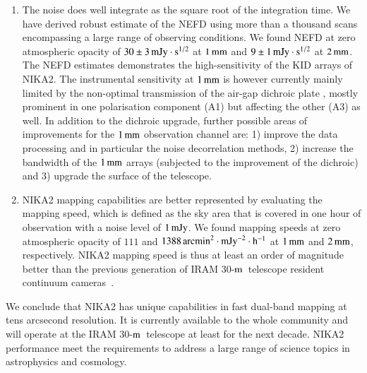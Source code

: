 \documentclass[traditionalabstract]{aa}
\newcommand{\trentemetre}{30-$\rm{m}$}
\newcommand{\lp}[1]{#1}
\begin{document}
\begin{enumerate}
{    uncertainties for the diffuse emission must further include the
    uncertainties on the reference beam efficiencies, as given in
    Table~\ref{tab:nika2summary}}. The absolute
  calibration uncertainties are of $5\%$ and the systematic
  calibration uncertainties evaluated at the IRAM
  \trentemetre\ reference Winter observing conditions are
  below $1\%$ in both channels.
   \vspace{1mm}
\item %
  The noise does well integrate as the square root of the integration time. We
  have derived robust estimate of the NEFD using more than a thousand scans
  encompassing a large range of observing conditions. We found NEFD at zero
  atmospheric opacity of $30 \pm 3\,\rm{mJy}\cdot s^{1/2}$ at $1\, \rm{mm}$ and
  $9 \pm 1\,\rm{mJy}\cdot s^{1/2}$ at $2\, \rm{mm}$.
  The NEFD estimates demonstrates the high-sensitivity of
  the KID arrays of NIKA2. 
  The instrumental sensitivity at $1\,\rm{mm}$
  is however currently mainly limited by the non-optimal transmission of
  the air-gap dichroic plate%
  , mostly prominent in one polarisation component
  (A1) but affecting the other (A3) as well.
  In addition to the dichroic upgrade, further possible areas of
  improvements for the $1\,\rm{mm}$ observation channel are: 1)
  improve the data processing and in particular the noise
  decorrelation methods, 2) increase the bandwidth of the $1\,\rm{mm}$
  arrays (subjected to the improvement of the dichroic) and 3)
  upgrade the surface of the telescope.
   \vspace{1mm}
\item  NIKA2 mapping capabilities are better represented by evaluating the
  mapping speed, which is defined as the sky area that is covered in one
  hour of observation with a noise level of $1\,\rm{mJy}$. We found
  mapping speeds at zero atmospheric opacity of $111$ and
  $1388\, \rm{arcmin}^2 \cdot \rm{mJy}^{-2} \cdot \rm{h}^{-1}$ at
  $1\, \rm{mm}$ and  $2\, \rm{mm}$, respectively. NIKA2 mapping speed is thus at
  least an order of magnitude better than the previous generation of IRAM
 \trentemetre\ telescope resident continuum cameras~\citep{Catalano2014, Staguhn2011_GISMO, Kreysa1999}.
  
\end{enumerate}


We conclude that NIKA2 has unique capabilities in fast dual-band
mapping at tens arcsecond resolution. {\lp It is currently available to the
whole community and will operate at the IRAM \trentemetre\ telescope
at least for the next decade.}
NIKA2 performance meet the requirements
to address a large range of science topics in astrophysics and
cosmology. 
\end{document}
